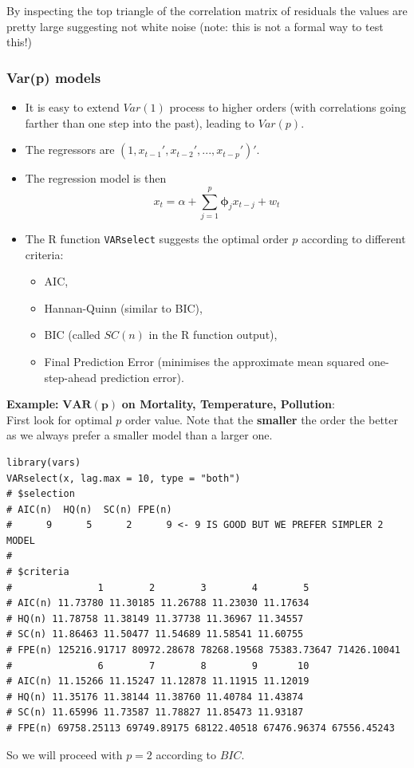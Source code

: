 \documentclass[11pt]{article}
\newcommand{\noi}{\noindent}
\begin{document}
\noi By inspecting the top triangle of the correlation matrix of residuals the values are pretty large suggesting not white noise (note: this is not a formal way to test this!)

\subsubsection{Var(p) models}
\begin{itemize}
    \item It is easy to extend $Var(1)$ process to higher orders (with correlations going farther than one step into the past), leading to $Var(p)$.
    \item The regressors are $(1, x_{t-1}', x_{t-2}', ..., x_{t-p}')'$.
    \item The regression model is then
        $$x_t = \alpha + \sum_{j=1}^{p}\boldsymbol{\phi}_jx_{t-j} + w_t$$
    \item The R function \texttt{VARselect} suggests the optimal order $p$ according to different criteria:
        \begin{itemize}
            \item AIC,
            \item Hannan-Quinn (similar to BIC),
            \item BIC (called $SC(n)$ in the R function output),
            \item Final Prediction Error (minimises the approximate mean squared one-step-ahead prediction error).
        \end{itemize}
\end{itemize}

\noi \textbf{Example:} $\boldsymbol{VAR(p)}$ \textbf{on Mortality, Temperature, Pollution}: \\
\noi First look for optimal $p$ order value. Note that the \textbf{smaller} the order the better as we always prefer a smaller model than a larger one.
\begin{lstlisting}
library(vars)
VARselect(x, lag.max = 10, type = "both")
# $selection
# AIC(n)  HQ(n)  SC(n) FPE(n) 
#      9      5      2      9 <- 9 IS GOOD BUT WE PREFER SIMPLER 2 MODEL
#
# $criteria
#               1        2        3        4        5
# AIC(n) 11.73780 11.30185 11.26788 11.23030 11.17634
# HQ(n) 11.78758 11.38149 11.37738 11.36967 11.34557
# SC(n) 11.86463 11.50477 11.54689 11.58541 11.60755
# FPE(n) 125216.91717 80972.28678 78268.19568 75383.73647 71426.10041
#               6        7        8        9       10
# AIC(n) 11.15266 11.15247 11.12878 11.11915 11.12019
# HQ(n) 11.35176 11.38144 11.38760 11.40784 11.43874
# SC(n) 11.65996 11.73587 11.78827 11.85473 11.93187
# FPE(n) 69758.25113 69749.89175 68122.40518 67476.96374 67556.45243
\end{lstlisting}
\noi So we will proceed with $p=2$ according to $BIC$.
\end{document}
